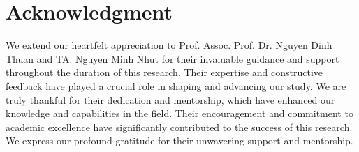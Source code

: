 \documentclass{ieeeojies}
\begin{document}
\section*{Acknowledgment}
We extend our heartfelt appreciation to Prof. Assoc. Prof. Dr. Nguyen Dinh Thuan and TA. Nguyen Minh Nhut for their invaluable guidance and support throughout the duration of this research. Their expertise and constructive feedback have played a crucial role in shaping and advancing our study. We are truly thankful for their dedication and mentorship, which have enhanced our knowledge and capabilities in the field. Their encouragement and commitment to academic excellence have significantly contributed to the success of this research. We express our profound gratitude for their unwavering support and mentorship.



\end{document}
